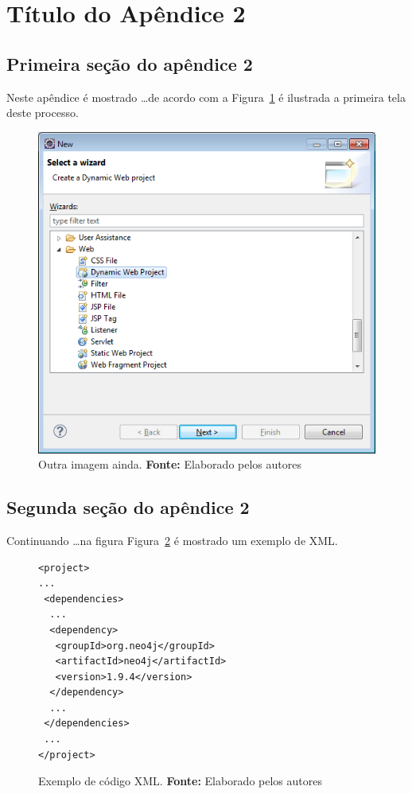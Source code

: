 \chapter*{Título do Apêndice 2}

\section*{Primeira seção do apêndice 2}

\par Neste apêndice é mostrado \ldots de acordo com a Figura~\ref{fig:ap2:identificador} é ilustrada a primeira tela deste processo.
\captionsetup[figure]{list=no}
\begin{figure}[h!]
 \centerline{\includegraphics[scale=0.3]{./imagens/apendice_img1.png}}
 \caption[Outra imagem ainda.]
           {Outra imagem ainda. \textbf{Fonte:} Elaborado pelos autores}
  \label{fig:ap2:identificador}
\end{figure}

\section*{Segunda seção do apêndice 2}


\par Continuando \ldots na figura Figura~\ref{fig:xml_exemplo} é mostrado um exemplo de XML.

\begin{figure}[h!]
\begin{lstlisting}[style=custom_XML]
<project>
...
 <dependencies>
  ...
  <dependency>
   <groupId>org.neo4j</groupId>
   <artifactId>neo4j</artifactId>
   <version>1.9.4</version>
  </dependency>
  ...
 </dependencies>
 ...
</project>
\end{lstlisting}  
 \caption[Exemplo de código XML.]
           {Exemplo de código XML. \textbf{Fonte:} Elaborado pelos autores}
  \label{fig:xml_exemplo}
\end{figure}


